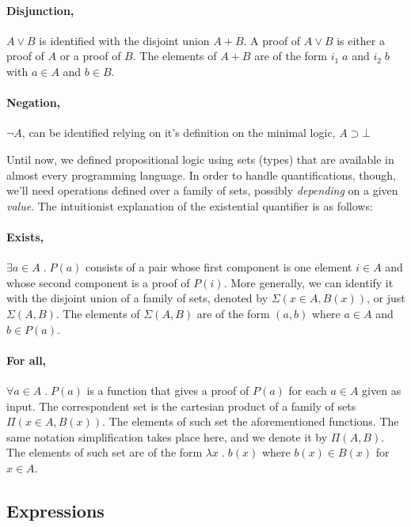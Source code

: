 \newcommand{\ione}{i_1}
\newcommand{\itwo}{i_2}
\paragraph{Disjunction,} $A \vee B$ is identified with the disjoint union $A + B$. A proof
of $A \vee B$ is either a proof of $A$ or a proof of $B$. The elements of $A + B$ are of the
form $\ione\; a$ and $\itwo\; b$ with $a \in A$ and $b \in B$.

\paragraph{Negation,} $\neg A$, can be identified relying on it's definition
on the minimal logic, $A \supset \bot$

Until now, we defined propositional logic using sets (types) that are available in almost every
programming language. In order to handle quantifications, though, we'll need operations defined over a 
family of sets, possibly \emph{depending} on a given \emph{value}. The intuitionist explanation
of the existential quantifier is as follows:

\paragraph{Exists,} $\exists a \in A \; . \; P(a)$ consists of a pair whose first
component is one element $i \in A$ and whose second component is a proof of $P(i)$. More generally,
we can identify it with the disjoint union of a family of sets, denoted by $\Sigma(x \in A, B(x))$,
or just $\Sigma(A, B)$. The elements of $\Sigma(A, B)$ are of the form $(a, b)$ where $a \in A$ and
$b \in P(a)$.

\paragraph{For all,} $\forall a \in A \; . \; P(a)$ is a function that gives a proof of $P(a)$
for each $a \in A$ given as input. The correspondent set is the cartesian product of a family
of sets $\Pi(x \in A, B(x))$. The elements of such set the aforementioned functions. The same
notation simplification takes place here, and we denote it by $\Pi(A, B)$. The elements of such set
are of the form $\lambda x\;.\;b(x)$ where $b(x) \in B(x)$ for $x \in A$. 

\subsection{Expressions}

